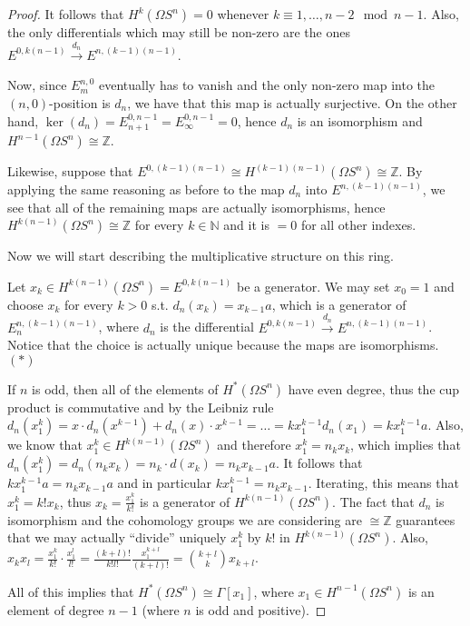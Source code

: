 \documentclass{article}
\newcommand{\numberset}{\mathbb}
\newcommand{\N}{\numberset{N}}
\newcommand{\Z}{\numberset{Z}}
\begin{document}
\begin{proof}
    It follows that $H^k(\Omega S^n)=0$ whenever $k\equiv1,\ldots,n-2\mod n-1$.
    Also, the only differentials which may still be non-zero are the ones
    $E^{0,k(n-1)}\xrightarrow{d_n}E^{n,(k-1)(n-1)}$.

    Now, since $E^{n,0}_m$ eventually has to vanish and the only non-zero map
    into the $(n,0)$-position is $d_n$, we have that this map is actually
    surjective. On the other hand,
    $\ker(d_n)=E^{0,n-1}_{n+1}=E^{0,n-1}_\infty=0$, hence $d_n$ is an
    isomorphism and $H^{n-1}(\Omega S^n)\cong\Z$.

    Likewise, suppose that $E^{0,(k-1)(n-1)}\cong H^{(k-1)(n-1)}(\Omega S^n)
    \cong\Z$. By applying the same reasoning as before to the map $d_n$ into
    $E^{n,(k-1)(n-1)}$, we see that all of the remaining maps are actually
    isomorphisms, hence $H^{k(n-1)}(\Omega S^n)\cong\Z$ for every $k\in\N$ and
    it is $=0$ for all other indexes.

    Now we will start describing the multiplicative structure on this ring.

    Let $x_k\in H^{k(n-1)}(\Omega S^n)=E^{0,k(n-1)}$ be a generator. We may set
    $x_0=1$ and choose $x_k$ for every $k>0$ s.t. $d_n(x_k)=x_{k-1}a$, which is
    a generator of $E^{n,(k-1)(n-1)}_n$, where $d_n$ is the differential
    $E^{0,k(n-1)}\xrightarrow{d_n}E^{n,(k-1)(n-1)}$. Notice that the choice is
    actually unique because the maps are isomorphisms. $(*)$
    
    If $n$ is odd, then all of the elements of $H^*(\Omega S^n)$ have even
    degree, thus the cup product is commutative and by the Leibniz rule
    $d_n(x_1^k)=x\cdot d_n(x^{k-1})+d_n(x)\cdot x^{k-1}=
    \ldots=kx_1^{k-1}d_n(x_1)=kx_1^{k-1}a$.
    Also, we know that $x_1^k\in H^{k(n-1)}(\Omega S^n)$ and therefore
    $x_1^k=n_kx_k$, which implies that $d_n(x_1^k)=d_n(n_kx_k)=n_k\cdot
    d(x_k)=n_kx_{k-1}a$. It follows that $kx_1^{k-1}a=n_kx_{k-1}a$ and in
    particular $kx_1^{k-1}=n_kx_{k-1}$. Iterating, this means
    that $x_1^k=k!x_k$, thus $x_k=\frac{x_1^k}{k!}$ is a generator of
    $H^{k(n-1)}(\Omega S^n)$. The fact that $d_n$ is isomorphism and the
    cohomology groups we are considering are $\cong\Z$ guarantees that we may
    actually ``divide'' uniquely $x_1^k$ by $k!$ in $H^{k(n-1)}(\Omega S^n)$.
    Also, $x_kx_l=\frac{x_1^k}{k!}\cdot\frac{x_1^l}{l!}=\frac{(k+l)!}{k!l!}
    \frac{x_1^{k+l}}{(k+l)!}=\binom{k+l}{k}x_{k+l}$.

    All of this implies that $H^*(\Omega S^n)\cong\Gamma[x_1]$, where $x_1\in
    H^{n-1}(\Omega S^n)$ is an element of degree $n-1$ (where $n$ is odd and
    positive).
\end{proof}
\end{document}

